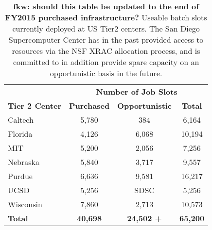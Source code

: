 \documentclass[11pt,a4paper]{article}
\begin{document}
\begin{table}
\begin{center}
\begin{tabular}{|l|c|c|c|}
\hline
& \multicolumn{3}{|c|}{\bf Number of Job Slots} \\ \cline{2-4}
{\bf Tier 2 Center}                         & {\bf Purchased} & {\bf Opportunistic} & {\bf Total} \\ \hline
Caltech                                         & 5,780 &    384 &   6,164 \\
Florida                                          & 4,126 & 6,068 & 10,194 \\
MIT                                               & 5,200 & 2,056 &   7,256 \\
Nebraska                                      & 5,840 & 3,717 &   9,557 \\
Purdue                                          & 6,636 & 9,581 & 16,217 \\
UCSD                                           & 5,256 & SDSC &  5,256 \\ 
Wisconsin                                     & 7,860 & 2,713  & 10,573 \\ \hline
{\bf Total}                                       & {\bf 40,698} & {\bf 24,502 +} & {\bf 65,200} \\ \hline
\end{tabular}
\caption[]
{
{\bf fkw: should this table be updated to the end of FY2015 purchased infrastructure?}
Useable batch slots currently deployed at US Tier2 centers.
The San Diego Supercomputer Center has in the past provided access
to resources via the NSF XRAC allocation process, and is committed to in addition 
provide spare capacity on an opportunistic basis in the future.
}
\label{compute-resources}
\end{center}
\end{table}
\end{document}
